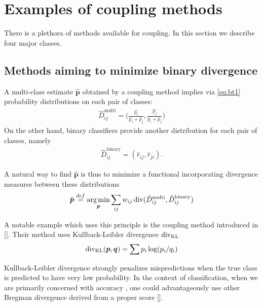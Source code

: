

\section{Examples of coupling methods} \label{sec:coupling}

There is a plethora of methods available for coupling. In this section we describe four major classes.

\subsection{Methods aiming to minimize binary divergence}

A multi-class estimate $\hat{\boldsymbol{p}}$ obtained by a coupling method implies via \eqref{eq:bt1} probability distributions on each pair of classes:
\begin{align*}
	\hat D_{ij}^\textrm{multi}= \biggl(\frac{\hat{p_i}}{\hat p_i + \hat p_j},\frac{\hat{p_j}}{\hat p_i + \hat p_j}\biggr)	
\end{align*}
On the other hand, binary classifiers provide another distribution for each pair of  classes, namely
\begin{align*}
\hat D_{ij}^\textrm{binary} = (\hat r_{ij}, \hat r_{ji}).
\end{align*}

A natural way to find  $\hat{\boldsymbol{p}}$ is thus to minimize a functional incorporating divergence measures between these distributions
\begin{align*}
\hat{\boldsymbol{p}} \stackrel{def}{=} \operatorname*{arg\,min}_{\boldsymbol{p}} \sum_{ij} w_{ij} \operatorname*{div} (\hat D_{ij}^\textrm{multi}, \hat D_{ij}^\textrm{binary})
\end{align*}

A notable example which uses this principle is the coupling method introduced in [\cite{hastie1998classification}]. Their method uses Kullback-Leibler divergence $\operatorname*{div}_\textrm{KL}$
\begin{align*}
	\operatorname*{div}\nolimits_\textrm{KL} (\boldsymbol{p}, \boldsymbol{q})= \sum p_i \log (p_i/ q_i)
\end{align*}

Kullback-Leibler divergence strongly penalizes  mispredictions when the true class is predicted to have very low probability. In the context of classification, when we are primarily concerned with accuracy , one could advantageously use other Bregman divergence derived from a proper score [\cite{gneiting2007strictly, buja2005loss}].
 
